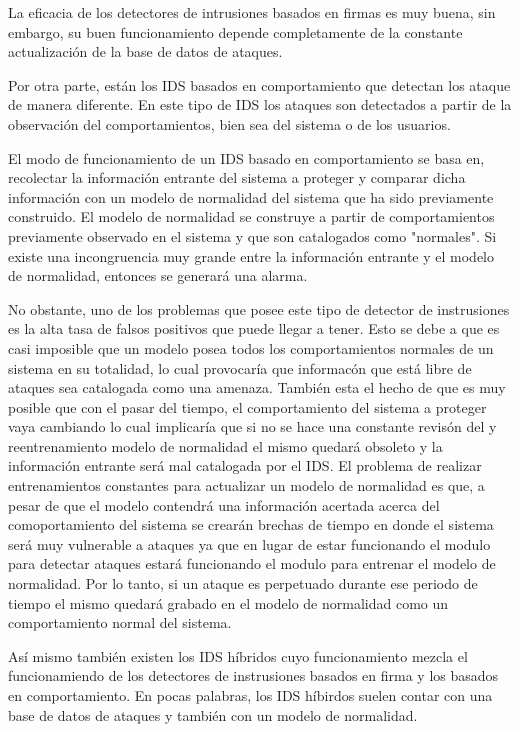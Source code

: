 La eficacia de los detectores de intrusiones basados en firmas es muy buena, sin embargo, su buen funcionamiento depende completamente de la constante actualización de la base de datos de ataques.


Por otra parte, est\'an los IDS basados en comportamiento que detectan los ataque de manera diferente. En este tipo de IDS los ataques son detectados a partir de la observaci\'on del comportamientos, bien sea del sistema o de los usuarios. 

El modo de funcionamiento de un IDS basado en comportamiento se basa en, recolectar la informaci\'on entrante del sistema a proteger y comparar dicha informaci\'on con un modelo de normalidad del sistema que ha sido previamente construido. El modelo de normalidad se construye a partir de comportamientos previamente observado en el sistema y que son catalogados como "normales". Si existe una incongruencia muy grande entre la informaci\'on entrante y el modelo de normalidad, entonces se generar\'a una alarma.

No obstante, uno de los problemas que posee este tipo de detector de instrusiones es la alta tasa de falsos positivos que puede llegar a tener. Esto se debe a que es casi imposible que un modelo posea todos los comportamientos normales de un sistema en su totalidad, lo cual provocar\'ia que informac\'on que est\'a libre de ataques sea catalogada como una amenaza. Tambi\'en esta el hecho de que es muy posible que con el pasar del tiempo, el comportamiento del sistema a proteger vaya cambiando lo cual implicar\'ia que si no se hace una constante revis\'on del y reentrenamiento modelo de normalidad el mismo quedar\'a obsoleto y la informaci\'on entrante ser\'a mal catalogada por el IDS. El problema de realizar entrenamientos constantes para actualizar un modelo de normalidad es que, a pesar de que el modelo contendr\'a una informaci\'on acertada acerca del comoportamiento del sistema se crear\'an brechas de tiempo en donde el sistema ser\'a muy vulnerable a ataques ya que en lugar de estar funcionando el modulo para detectar ataques estar\'a funcionando el modulo para entrenar el modelo de normalidad. Por lo tanto, si un ataque es perpetuado durante ese periodo de tiempo el mismo quedar\'a grabado en el modelo de normalidad como un comportamiento normal del sistema.

As\'i mismo tambi\'en existen los IDS h\'ibridos cuyo funcionamiento mezcla el funcionamiendo de los detectores de instrusiones basados en firma y los basados en comportamiento. En pocas palabras, los IDS h\'ibirdos suelen contar con una base de datos de ataques y tambi\'en con un modelo de normalidad.

